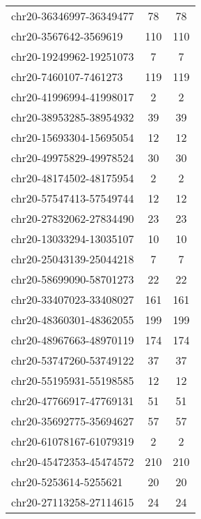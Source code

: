 \begin{longtable}{lSS}
	chr20-36346997-36349477 & 78     & 78                         \\
	chr20-3567642-3569619   & 110    & 110                        \\
	chr20-19249962-19251073 & 7      & 7                          \\
	chr20-7460107-7461273   & 119    & 119                        \\
	chr20-41996994-41998017 & 2      & 2                          \\
	chr20-38953285-38954932 & 39     & 39                         \\
	chr20-15693304-15695054 & 12     & 12                         \\
	chr20-49975829-49978524 & 30     & 30                         \\
	chr20-48174502-48175954 & 2      & 2                          \\
	chr20-57547413-57549744 & 12     & 12                         \\
	chr20-27832062-27834490 & 23     & 23                         \\
	chr20-13033294-13035107 & 10     & 10                         \\
	chr20-25043139-25044218 & 7      & 7                          \\
	chr20-58699090-58701273 & 22     & 22                         \\
	chr20-33407023-33408027 & 161    & 161                        \\
	chr20-48360301-48362055 & 199    & 199                        \\
	chr20-48967663-48970119 & 174    & 174                        \\
	chr20-53747260-53749122 & 37     & 37                         \\
	chr20-55195931-55198585 & 12     & 12                         \\
	chr20-47766917-47769131 & 51     & 51                         \\
	chr20-35692775-35694627 & 57     & 57                         \\
	chr20-61078167-61079319 & 2      & 2                          \\
	chr20-45472353-45474572 & 210    & 210                        \\
	chr20-5253614-5255621   & 20     & 20                         \\
	chr20-27113258-27114615 & 24     & 24                         \\

\end{longtable}
